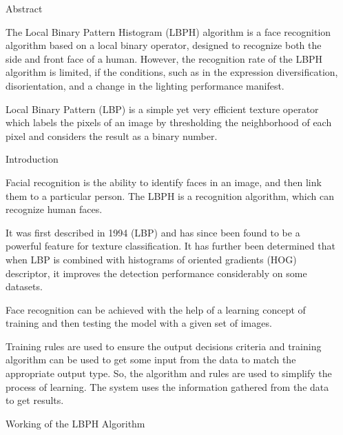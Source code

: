 \documentclass[final]{beamer}
\newlength{\sepwidth}
\newlength{\colwidth}
\newcommand{\separatorcolumn}{\begin{column}{\sepwidth}\end{column}}
\begin{document}
\begin{frame}[t]
\begin{columns}[t]
\separatorcolumn

\begin{column}{\colwidth}

  \begin{block}{Abstract}


The Local Binary Pattern Histogram (LBPH) algorithm is a face recognition algorithm based on a local binary operator, designed to recognize both the side and front face of a human. However, the recognition rate of the LBPH algorithm is limited, if the conditions, such as in the expression diversification, disorientation, and a change in the lighting performance manifest.

Local Binary Pattern (LBP) is a simple yet very efficient texture operator which labels the pixels of an image by thresholding the neighborhood of each pixel and considers the result as a binary number.

  \end{block}

  \begin{block}{Introduction}

Facial recognition is the ability to identify faces in an image, and then link them to a particular person. The LBPH is a recognition algorithm, which can recognize human faces.

It was first described in 1994 (LBP) and has since been found to be a powerful feature for texture classification. It has further been determined that when LBP is combined with histograms of oriented gradients (HOG) descriptor, it improves the detection performance considerably on some datasets.

Face recognition can be achieved with the help of a learning concept of training and then testing the model with a given set of images.

Training rules are used to ensure the output decisions criteria and training algorithm can be used to get some input from the data to match the appropriate output type. So, the algorithm and rules are used to simplify the process of learning. The system uses the information gathered from the data to get results.


  \end{block}
  \begin{block}{Working of the LBPH Algorithm}



\end{block}
\end{column}
\end{columns}
\end{frame}
\end{document}
